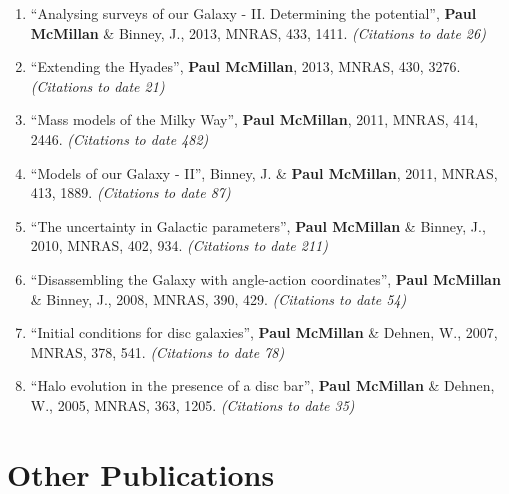 \documentclass{resume}
\begin{document}
\begin{enumerate}
\item ``Analysing surveys of our Galaxy - II. Determining the potential'', \textbf{Paul McMillan} \& Binney, J., 2013, MNRAS, 433, 1411. \textit{(Citations to date 26)}

\item ``Extending the Hyades'', \textbf{Paul McMillan}, 2013, MNRAS, 430, 3276. \textit{(Citations to date 21)}

\item ``Mass models of the Milky Way'', \textbf{Paul McMillan}, 2011, MNRAS, 414, 2446. \textit{(Citations to date 482)}

\item ``Models of our Galaxy - II'', Binney, J. \& \textbf{Paul McMillan}, 2011, MNRAS, 413, 1889. \textit{(Citations to date 87)}

\item ``The uncertainty in Galactic parameters'', \textbf{Paul McMillan} \& Binney, J., 2010, MNRAS, 402, 934. \textit{(Citations to date 211)}

\item ``Disassembling the Galaxy with angle-action coordinates'', \textbf{Paul McMillan} \& Binney, J., 2008, MNRAS, 390, 429. \textit{(Citations to date 54)}

\item ``Initial conditions for disc galaxies'', \textbf{Paul McMillan} \& Dehnen, W., 2007, MNRAS, 378, 541. \textit{(Citations to date 78)}

\item ``Halo evolution in the presence of a disc bar'', \textbf{Paul McMillan} \& Dehnen, W., 2005, MNRAS, 363, 1205. \textit{(Citations to date 35)}

\end{enumerate}\section*{Other Publications}
\end{document}
